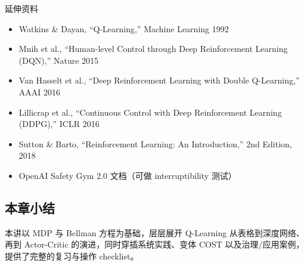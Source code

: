 \documentclass[a4paper]{article}
\begin{document}
\begin{knowledgebox}{延伸资料}
\begin{itemize}
    \item Watkins \& Dayan, ``Q-Learning,'' Machine Learning 1992
    \item Mnih et al., ``Human-level Control through Deep Reinforcement Learning (DQN),'' Nature 2015
    \item Van Hasselt et al., ``Deep Reinforcement Learning with Double Q-Learning,'' AAAI 2016
    \item Lillicrap et al., ``Continuous Control with Deep Reinforcement Learning (DDPG),'' ICLR 2016
    \item Sutton \& Barto, ``Reinforcement Learning: An Introduction,'' 2nd Edition, 2018
    \item OpenAI Safety Gym 2.0 文档（可做 interruptibility 测试）
\end{itemize}
\end{knowledgebox}

\subsection{本章小结}

本讲以 MDP 与 Bellman 方程为基础，层层展开 Q-Learning 从表格到深度网络、再到 Actor-Critic 的演进，同时穿插系统实践、变体 COST 以及治理/应用案例，提供了完整的复习与操作 checklist。
\end{document}
